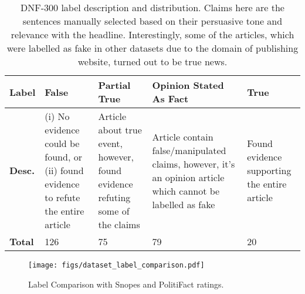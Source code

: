 \documentclass[11pt,a4paper]{article}
\begin{document}
{
\begin{table}
\centering\scriptsize
\begin{tabular}{|p{0.5cm}|p{1.2cm}|p{1.3cm}|p{1.5cm}|p{1cm}|}
\hline
\textbf{Label} & \textbf{False} & \textbf{Partial True} & \textbf{Opinion Stated As Fact} & \textbf{True}\\
\hline
\textbf{Desc.} & (i) No evidence could be found, or (ii) found evidence to refute the entire article & Article about true event, however, found evidence refuting some of the claims & Article contain false/manipulated claims, however, it's an opinion article which cannot be labelled as fake & Found evidence supporting the entire article\\
\hline
\textbf{Total} & 126 & 75 & 79 & 20\\
\hline
\end{tabular}
\caption{\label{labelDesc}DNF-300 label description and distribution. Claims here are the sentences manually selected based on their persuasive tone and relevance with the headline. Interestingly, some of the articles, which were labelled as fake in other datasets due to the domain of publishing website, turned out to be true news. 
}
\end{table}
}
{
\begin{figure}[h]
\begin{center}
\texttt{[image: figs/dataset\_label\_comparison.pdf]}
\caption{\label{fig:labelComp} Label Comparison with Snopes and PolitiFact ratings.}
\end{center}
\end{figure}
}
\end{document}
